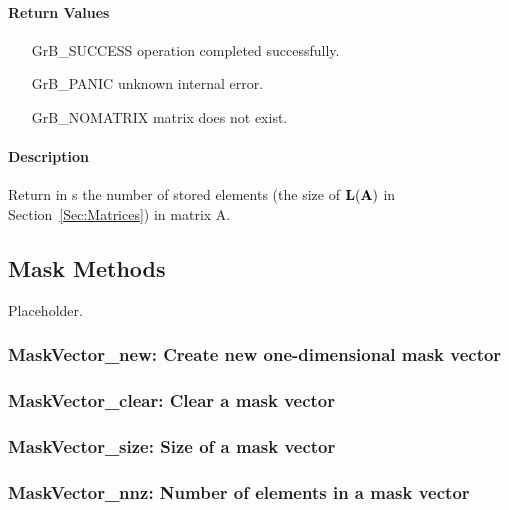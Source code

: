 \paragraph{Return Values}

\begin{itemize}[leftmargin=2.1in]
\item[{\sf GrB\_SUCCESS}]   operation completed successfully.
\item[{\sf GrB\_PANIC}]     unknown internal error.
\item[{\sf GrB\_NOMATRIX}]  matrix does not exist.
\end{itemize}

\paragraph{Description}

Return in {\sf s} the number of stored elements (the size of $\bold{L}({\bf A})$
in Section~\ref{Sec:Matrices}) in matrix {\sf A}.

\subsection{Mask Methods}

Placeholder.

\subsubsection{{\sf MaskVector\_new}: Create new one-dimensional mask vector}

\subsubsection{{\sf MaskVector\_clear}: Clear a mask vector}

\subsubsection{{\sf MaskVector\_size}: Size of a mask vector}

\subsubsection{{\sf MaskVector\_nnz}: Number of elements in a mask vector}

